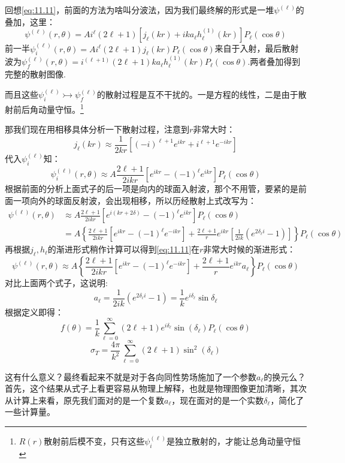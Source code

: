 \documentclass[a4paper,zihao=-4,linespread=1]{ctexrep}
\begin{document}
	回想\ref{eq:11.11}，前面的方法为啥叫分波法，因为我们最终解的形式是一堆$\psi^{(\ell)}$的叠加，这里：
	\[\psi^{(\ell)}(r,\theta)=A i^\ell(2\ell+1)\left[j_\ell(kr)+ika_\ell h^{(1)}_\ell(kr)\right]P_\ell(\cos\theta)\]
	前一半$\psi^{(\ell)}_i(r,\theta)=A i^\ell(2\ell+1)j_\ell(kr)P_\ell(\cos\theta)$来自于入射，最后散射波为$\psi^{(\ell)}_f(r,\theta)=i^{(\ell+1)}(2\ell+1)ka_\ell h^{(1)}_\ell(kr)P_\ell(\cos\theta)$.两者叠加得到完整的散射图像.
	
	而且这些$\psi^{(\ell)}_i\rightarrowtail\psi^{(\ell)}_f$的散射过程是互不干扰的。一是方程的线性，二是由于散射前后角动量守恒。\footnote{$R(r)$散射前后模不变，只有这些$\psi^{(\ell)}_i$是独立散射的，才能让总角动量守恒}
	
	那我们现在用相移具体分析一下散射过程，注意到$r$非常大时：
	$$j_\ell(kr)\approx \frac{1}{2kr}\left[(-i)^{\ell+1}e^{ikr}+i^{\ell+1}e^{-ikr}\right]$$
	代入$\psi^{(\ell)}_i$知：
	\[\psi^{(\ell)}_i(r,\theta)\approx A\frac{2\ell+1}{2ikr}\left[e^{ikr}-(-1)^\ell e^{ikr}\right]P_\ell(\cos\theta)\]
	根据前面的分析上面式子的后一项是向内的球面入射波，那个不用管，要紧的是前面一项向外的球面反射波，会出现相移，所以历经散射上式改写为：
	\begin{equation}
		\begin{aligned}
		\psi^{(\ell)}(r,\theta)&\approx A\frac{2\ell+1}{2ikr}\left[e^{i(kr+2\delta)}-(-1)^\ell e^{ikr}\right]P_\ell(\cos\theta)\\
		&=A\left\{\frac{2\ell+1}{2ikr}\left[e^{ikr}-(-1)^\ell e^{-ikr}\right]+\frac{2\ell+1}{r}e^{ikr}\left[\frac{1}{2ik}(e^{2\delta_\ell i}-1)\right]\right\}P_\ell(\cos\theta)
		\end{aligned}
	\end{equation}	
	再根据$j_\ell,h_\ell$的渐进形式稍作计算可以得到\ref{eq:11.11}在$r$非常大时候的渐进形式：
	\[\psi^{(\ell)}(r,\theta)\approx A\left\{\frac{2\ell+1}{2ikr}\left[e^{ikr}-(-1)^\ell e^{-ikr}\right]+\frac{2\ell+1}{r}e^{ikr}a_\ell\right\}P_\ell(\cos\theta)\]
	对比上面两个式子，这说明:
	\[a_\ell=\frac{1}{2ik}(e^{2\delta_\ell i}-1)=\frac{1}{k}e^{i\delta_\ell}\sin\delta_\ell\]
	根据定义即得：
	\[f(\theta)=\frac{1}{k} \sum_{\ell=0}^{\infty}(2 \ell+1) e^{i \delta_{\ell}} \sin \left(\delta_{\ell}\right) P_{\ell}(\cos \theta)\]
	\[\sigma_T=\frac{4 \pi}{k^{2}} \sum_{\ell=0}^{\infty}(2 \ell+1) \sin ^{2}\left(\delta_{\ell}\right) \]
	
	这有什么意义？最终看起来不就是对于各向同性势场施加了一个参数$a_\ell$的换元么？首先，这个结果从式子上看更容易从物理上解释，也就是物理图像更加清晰，其次从计算上来看，原先我们面对的是一个复数$a_\ell$，现在面对的是一个实数$\delta_\ell$，简化了一些计算量。
	
\end{document}
